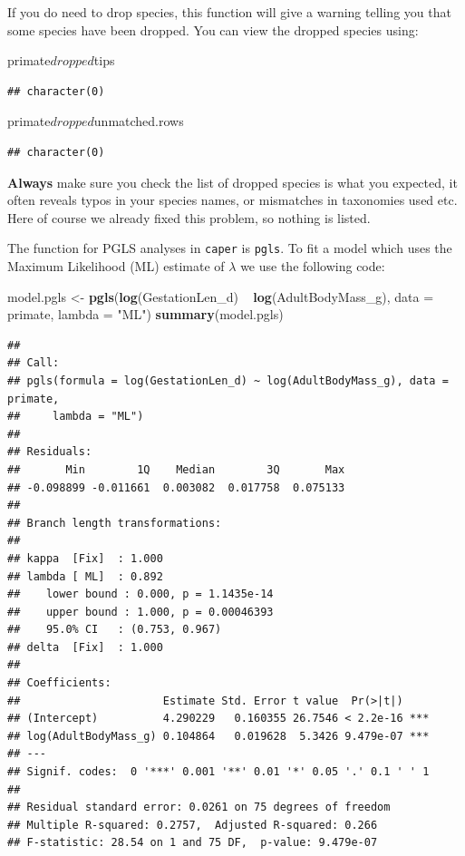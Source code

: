 \documentclass[]{book}
\newenvironment{Shaded}{\begin{snugshade}}{\end{snugshade}}
\newcommand{\KeywordTok}[1]{\textcolor[rgb]{0.13,0.29,0.53}{\textbf{{#1}}}}
\newcommand{\DataTypeTok}[1]{\textcolor[rgb]{0.13,0.29,0.53}{{#1}}}
\newcommand{\StringTok}[1]{\textcolor[rgb]{0.31,0.60,0.02}{{#1}}}
\newcommand{\NormalTok}[1]{{#1}}
\begin{document}
If you do need to drop species, this function will give a warning
telling you that some species have been dropped. You can view the
dropped species using:

\begin{Shaded}
\begin{Highlighting}[]
\NormalTok{primate$dropped$tips}
\end{Highlighting}
\end{Shaded}

\begin{verbatim}
## character(0)
\end{verbatim}

\begin{Shaded}
\begin{Highlighting}[]
\NormalTok{primate$dropped$unmatched.rows}
\end{Highlighting}
\end{Shaded}

\begin{verbatim}
## character(0)
\end{verbatim}

\textbf{Always} make sure you check the list of dropped species is what
you expected, it often reveals typos in your species names, or
mismatches in taxonomies used etc. Here of course we already fixed this
problem, so nothing is listed.

The function for PGLS analyses in \texttt{caper} is \texttt{pgls}. To
fit a model which uses the Maximum Likelihood (ML) estimate of
\(\lambda\) we use the following code:

\begin{Shaded}
\begin{Highlighting}[]
\NormalTok{model.pgls <-}\StringTok{ }\KeywordTok{pgls}\NormalTok{(}\KeywordTok{log}\NormalTok{(GestationLen_d) ~}\StringTok{ }\KeywordTok{log}\NormalTok{(AdultBodyMass_g), }\DataTypeTok{data =} \NormalTok{primate, }
                   \DataTypeTok{lambda =} \StringTok{"ML"}\NormalTok{)}
\KeywordTok{summary}\NormalTok{(model.pgls)}
\end{Highlighting}
\end{Shaded}

\begin{verbatim}
## 
## Call:
## pgls(formula = log(GestationLen_d) ~ log(AdultBodyMass_g), data = primate, 
##     lambda = "ML")
## 
## Residuals:
##       Min        1Q    Median        3Q       Max 
## -0.098899 -0.011661  0.003082  0.017758  0.075133 
## 
## Branch length transformations:
## 
## kappa  [Fix]  : 1.000
## lambda [ ML]  : 0.892
##    lower bound : 0.000, p = 1.1435e-14
##    upper bound : 1.000, p = 0.00046393
##    95.0% CI   : (0.753, 0.967)
## delta  [Fix]  : 1.000
## 
## Coefficients:
##                      Estimate Std. Error t value  Pr(>|t|)    
## (Intercept)          4.290229   0.160355 26.7546 < 2.2e-16 ***
## log(AdultBodyMass_g) 0.104864   0.019628  5.3426 9.479e-07 ***
## ---
## Signif. codes:  0 '***' 0.001 '**' 0.01 '*' 0.05 '.' 0.1 ' ' 1
## 
## Residual standard error: 0.0261 on 75 degrees of freedom
## Multiple R-squared: 0.2757,  Adjusted R-squared: 0.266 
## F-statistic: 28.54 on 1 and 75 DF,  p-value: 9.479e-07
\end{verbatim}
\end{document}
